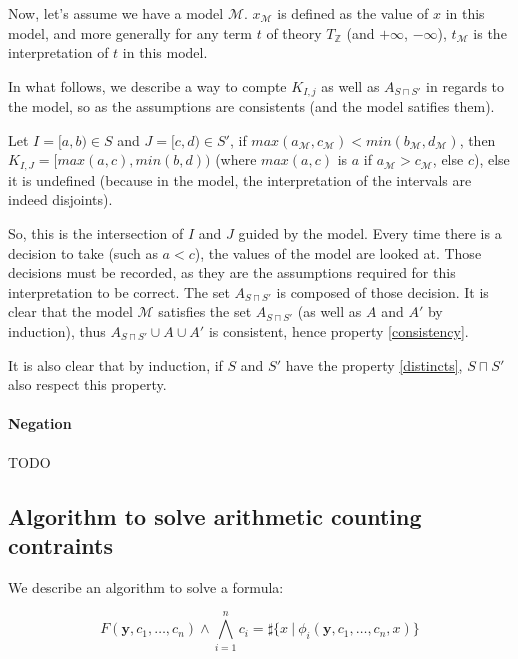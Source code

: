 \documentclass[]{article}
\begin{document}
Now, let's assume we have a model $\mathcal{M}$. $x_\mathcal{M}$ is
defined as the value of $x$ in this model, and more generally for any
term $t$ of theory $T_{\mathbb{Z}}$ (and $+\infty$, $-\infty$),
$t_{\mathcal{M}}$ is the interpretation of $t$ in this model.

In what follows, we describe a way to compte $K_{I, j}$ as well as
$A_{S \sqcap S'}$ in regards to the model, so as the assumptions are
consistents (and the model satifies them).

Let $I = [a, b) \in S$ and $J = [c, d) \in S'$, if
$max(a_\mathcal{M}, c_\mathcal{M}) < min(b_\mathcal{M}, d_\mathcal{M})$,
then $K_{I, J} = [max(a, c), min(b, d))$ (where $max(a, c)$ is $a$
if $a_\mathcal{M} > c_\mathcal{M}$, else $c$), else it is undefined
(because in the model, the interpretation of the intervals are indeed
disjoints).

So, this is the intersection of $I$ and $J$ guided by the model.
Every time there is a decision to take (such as $a < c$), the values
of the model are looked at. Those decisions must be recorded, as they
are the assumptions required for this interpretation to be correct. The
set $A_{S\sqcap S'}$ is composed of those decision. It is clear that
the model $\mathcal{M}$ satisfies the set $A_{S \sqcap S'}$ (as well
as $A$ and $A'$ by induction), thus
$A_{S \sqcap S'} \cup A \cup A'$ is consistent, hence property
\ref{consistency}.

It is also clear that by induction, if $S$ and $S'$ have the
property \ref{distincts}, $S\sqcap S'$ also respect this property.

\paragraph{Negation}\label{negation}

TODO

\subsection{Algorithm to solve arithmetic counting
contraints}\label{algorithm-to-solve-arithmetic-counting-contraints}

We describe an algorithm to solve a formula:

\begin{equation}
F(\mathbf{y}, c_1, \ldots, c_n) \land
\bigwedge_{i = 1} ^n c_i = \sharp\{x\ |\ \phi_i(\mathbf{y}, c_1, \ldots, c_n, x)\}
\end{equation}
\end{document}
